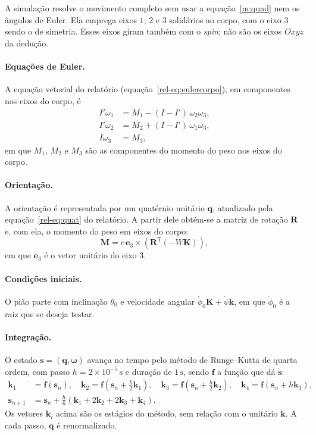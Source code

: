 \documentclass[11pt,a4paper]{article}
\newcommand{\vet}[1]{\mathbf{#1}}
\newcommand{\vomega}{\boldsymbol{\omega}}
\newcommand{\un}[1]{\,\mathrm{#1}}
\newcommand{\phid}{\dot{\phi}}
\newcommand{\psid}{\dot{\psi}}
\begin{document}
A simulação resolve o movimento completo sem usar a equação~\ref{m:quad} nem os ângulos de Euler. Ela emprega eixos $1$, $2$ e $3$ solidários ao corpo, com o eixo $3$ sendo o de simetria. Esses eixos giram também com o \textit{spin}; não são os eixos $Oxyz$ da dedução.

\paragraph{Equações de Euler.} A equação vetorial do relatório (equação~\ref*{rel-eq:eulercorpo}), em componentes nos eixos do corpo, é
\begin{align}
I'\dot{\omega}_1&=M_1-(I-I')\,\omega_2\omega_3,\\
I'\dot{\omega}_2&=M_2+(I-I')\,\omega_1\omega_3,\\
I\dot{\omega}_3&=M_3,
\end{align}
em que $M_1$, $M_2$ e $M_3$ são as componentes do momento do peso nos eixos do corpo.

\paragraph{Orientação.} A orientação é representada por um quatérnio unitário $\vet{q}$, atualizado pela equação~\ref*{rel-eq:quat} do relatório. A partir dele obtém-se a matriz de rotação $\vet{R}$ e, com ela, o momento do peso em eixos do corpo:
\begin{equation}
\vet{M}=c\,\vet{e}_3\times\left(\vet{R}^{\mathsf{T}}\left(-W\vet{K}\right)\right),
\end{equation}
em que $\vet{e}_3$ é o vetor unitário do eixo $3$.

\paragraph{Condições iniciais.} O pião parte com inclinação $\theta_0$ e velocidade angular $\phid_0\vet{K}+\psid\vet{k}$, em que $\phid_0$ é a raiz que se deseja testar.

\paragraph{Integração.} O estado $\vet{s}=(\vet{q},\vomega)$ avança no tempo pelo método de Runge--Kutta de quarta ordem, com passo $h=2\times10^{-5}\un{s}$ e duração de $1\un{s}$, sendo $\vet{f}$ a função que dá $\dot{\vet{s}}$:
\begin{align}
\vet{k}_1&=\vet{f}(\vet{s}_n),\quad
\vet{k}_2=\vet{f}\left(\vet{s}_n+\tfrac{h}{2}\vet{k}_1\right),\quad
\vet{k}_3=\vet{f}\left(\vet{s}_n+\tfrac{h}{2}\vet{k}_2\right),\quad
\vet{k}_4=\vet{f}\left(\vet{s}_n+h\vet{k}_3\right),\\
\vet{s}_{n+1}&=\vet{s}_n+\tfrac{h}{6}\left(\vet{k}_1+2\vet{k}_2+2\vet{k}_3+\vet{k}_4\right).
\end{align}
Os vetores $\vet{k}_i$ acima são os estágios do método, sem relação com o unitário $\vet{k}$. A cada passo, $\vet{q}$ é renormalizado.
\end{document}
